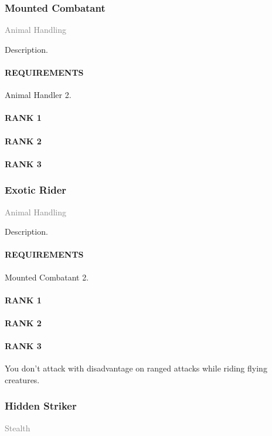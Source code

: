 \subsubsection{Mounted Combatant} \label{feat::mountedcombatant} %
\small{\textcolor{gray}{Animal Handling}}

\normalsize
Description.
\paragraph{REQUIREMENTS} Animal Handler 2.
\paragraph{RANK 1}
\paragraph{RANK 2}
\paragraph{RANK 3}

\subsubsection{Exotic Rider} \label{feat::exoticrider} %
\small{\textcolor{gray}{Animal Handling}}

\normalsize
Description.
\paragraph{REQUIREMENTS} Mounted Combatant 2.
\paragraph{RANK 1}
\paragraph{RANK 2}
\paragraph{RANK 3} You don't attack with disadvantage on ranged attacks while riding flying creatures.

\subsubsection{Hidden Striker} \label{feat::hiddenstriker} %
\small{\textcolor{gray}{Stealth}}

